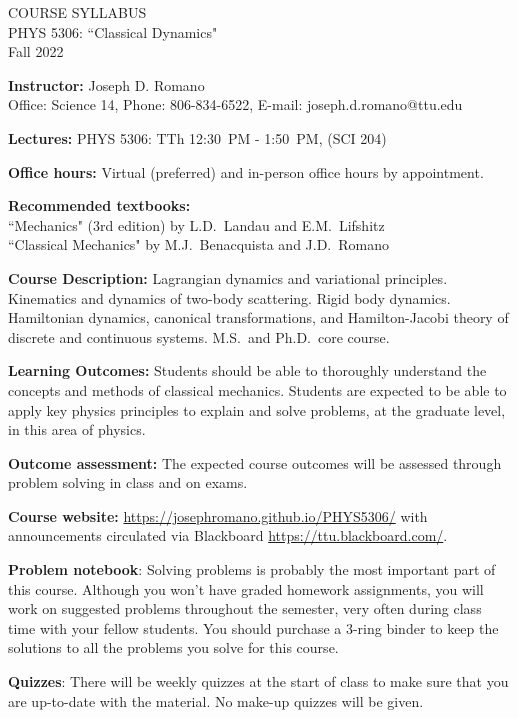 \documentclass[11pt]{NSF}
\begin{document}
\begin{center}
COURSE SYLLABUS\\
PHYS 5306: ``Classical Dynamics"\\
Fall 2022\\
\end{center}

{\bf Instructor:}
Joseph D. Romano\\
Office: Science 14, Phone: 806-834-6522, E-mail: joseph.d.romano@ttu.edu

{\bf Lectures:}
PHYS 5306: TTh 12:30~PM - 1:50~PM, (SCI 204)

{\bf Office hours:}
Virtual (preferred) and in-person office hours by appointment.

{\bf Recommended textbooks:}\\
``Mechanics" (3rd edition) by L.D.~Landau and E.M.~Lifshitz\\
``Classical Mechanics" by M.J.~Benacquista and J.D.~Romano

{\bf Course Description:}
Lagrangian dynamics and variational principles. Kinematics and dynamics of
two-body scattering. Rigid body dynamics. Hamiltonian dynamics, canonical
transformations, and Hamilton-Jacobi theory of discrete and continuous systems.
M.S.\ and Ph.D.\ core course.  

{\bf Learning Outcomes:}
Students should be able to thoroughly understand the concepts and
methods of classical mechanics. Students are expected to be
able to apply key physics principles to explain and solve problems,
at the graduate level, in this area of physics.

{\bf Outcome assessment:} 
The expected course outcomes will be assessed through problem solving 
in class and on exams.

{\bf Course website:}
\url{https://josephromano.github.io/PHYS5306/} with announcements
circulated via Blackboard \url{https://ttu.blackboard.com/}.

{\bf Problem notebook}:
Solving problems is probably the most important part of this course.
Although you won't have graded homework assignments, you will 
work on suggested problems throughout the semester, very often
during class time with your fellow students.
You should purchase a 3-ring binder to keep the solutions to 
all the problems you solve for this course.

{\bf Quizzes}:
There will be weekly quizzes at the start of class to make sure 
that you are up-to-date with the material.
No make-up quizzes will be given.
\end{document}
